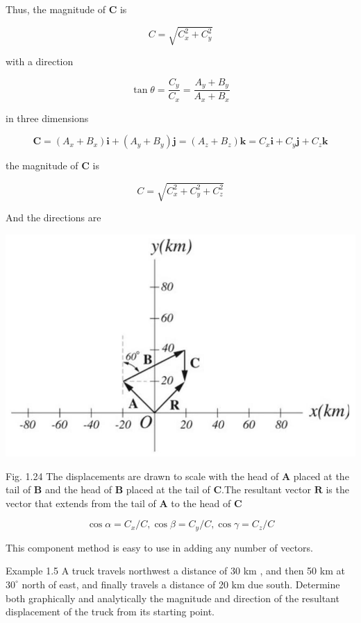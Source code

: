 \documentclass[10pt]{article}
\begin{document}
Thus, the magnitude of $\mathbf{C}$ is

$$
C=\sqrt{C_{x}^{2}+C_{y}^{2}}
$$

with a direction

$$
\tan \theta=\frac{C_{y}}{C_{x}}=\frac{A_{y}+B_{y}}{A_{x}+B_{x}}
$$

in three dimensions

$$
\mathbf{C}=\left(A_{x}+B_{x}\right) \mathbf{i}+\left(A_{y}+B_{y}\right) \mathbf{j}=\left(A_{z}+B_{z}\right) \mathbf{k}=C_{x} \mathbf{i}+C_{y} \mathbf{j}+C_{z} \mathbf{k}
$$

the magnitude of $\mathbf{C}$ is

$$
C=\sqrt{C_{x}^{2}+C_{y}^{2}+C_{z}^{2}}
$$

And the directions are

\begin{center}
\includegraphics[max width=\textwidth]{2024_09_13_db1f357d2aad0a03eb2eg-019(1)}
\end{center}

Fig. 1.24 The displacements are drawn to scale with the head of $\mathbf{A}$ placed at the tail of $\mathbf{B}$ and the head of $\mathbf{B}$ placed at the tail of $\mathbf{C}$.The resultant vector $\mathbf{R}$ is the vector that extends from the tail of $\mathbf{A}$ to the head of $\mathbf{C}$

$$
\cos \alpha=C_{x} / C, \cos \beta=C_{y} / C, \cos \gamma=C_{z} / C
$$

This component method is easy to use in adding any number of vectors.

Example 1.5 A truck travels northwest a distance of 30 km , and then 50 km at $30^{\circ}$ north of east, and finally travels a distance of 20 km due south. Determine both graphically and analytically the magnitude and direction of the resultant displacement of the truck from its starting point.
\end{document}

